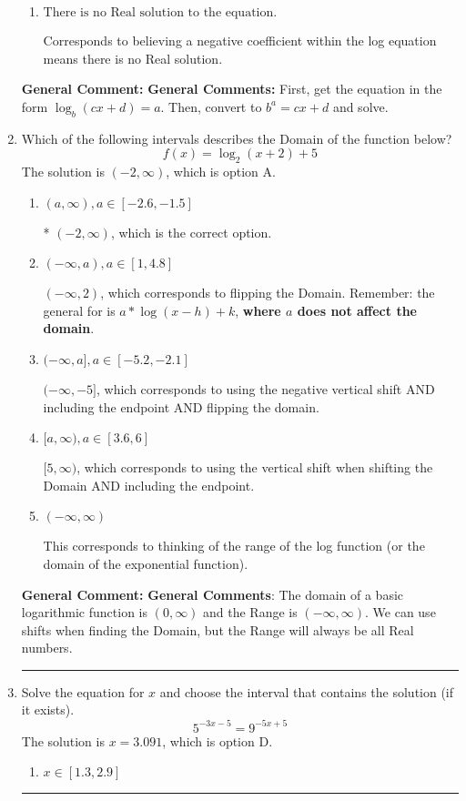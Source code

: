 \documentclass{extbook}[14pt]
\newcommand{\litem}[1]{\item #1

\rule{\textwidth}{0.4pt}}
\begin{document}
\begin{enumerate}
{\begin{enumerate}[label=\Alph*.]
* $x = -2.969$, which is the correct option.
\item \( \text{There is no Real solution to the equation.} \)

Corresponds to believing a negative coefficient within the log equation means there is no Real solution.
\end{enumerate}

\textbf{General Comment:} \textbf{General Comments:} First, get the equation in the form $\log_b{(cx+d)} = a$. Then, convert to $b^a = cx+d$ and solve.
}
\litem{
Which of the following intervals describes the Domain of the function below?
\[ f(x) = \log_2{(x+2)}+5 \]The solution is \( (-2, \infty) \), which is option A.\begin{enumerate}[label=\Alph*.]
\item \( (a, \infty), a \in [-2.6, -1.5] \)

* $(-2, \infty)$, which is the correct option.
\item \( (-\infty, a), a \in [1, 4.8] \)

$(-\infty, 2)$, which corresponds to flipping the Domain. Remember: the general for is $a*\log(x-h)+k$, \textbf{where $a$ does not affect the domain}.
\item \( (-\infty, a], a \in [-5.2, -2.1] \)

$(-\infty, -5]$, which corresponds to using the negative vertical shift AND including the endpoint AND flipping the domain.
\item \( [a, \infty), a \in [3.6, 6] \)

$[5, \infty)$, which corresponds to using the vertical shift when shifting the Domain AND including the endpoint.
\item \( (-\infty, \infty) \)

This corresponds to thinking of the range of the log function (or the domain of the exponential function).
\end{enumerate}

\textbf{General Comment:} \textbf{General Comments}: The domain of a basic logarithmic function is $(0, \infty)$ and the Range is $(-\infty, \infty)$. We can use shifts when finding the Domain, but the Range will always be all Real numbers.
}
\litem{
Solve the equation for $x$ and choose the interval that contains the solution (if it exists).
\[ 5^{-3x-5} = 9^{-5x+5} \]The solution is \( x = 3.091 \), which is option D.\begin{enumerate}[label=\Alph*.]
\item \( x \in [1.3, 2.9] \)


\end{enumerate}}
\end{enumerate}
\end{document}
